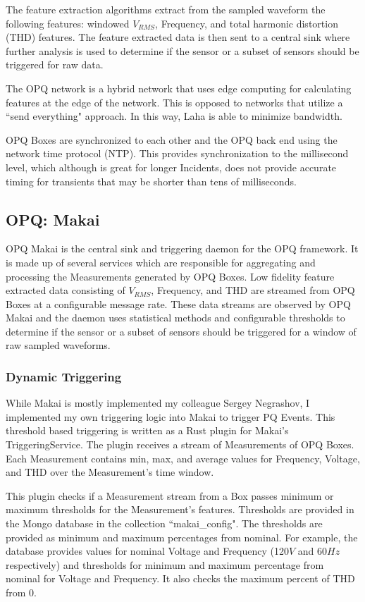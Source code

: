 The feature extraction algorithms extract from the sampled waveform the following features: windowed $V_{RMS}$, Frequency, and total harmonic distortion (THD) features. The feature extracted data is then sent to a central sink where further analysis is used to determine if the sensor or a subset of sensors should be triggered for raw data.

The OPQ network is a hybrid network that uses edge computing for calculating features at the edge of the network. This is opposed to networks that utilize a ``send everything" approach. In this way, Laha is able to minimize bandwidth.

OPQ Boxes are synchronized to each other and the OPQ back end using the network time protocol (NTP). This provides synchronization to the millisecond level, which although is great for longer Incidents, does not provide accurate timing for transients that may be shorter than tens of milliseconds.

\subsection{OPQ: Makai}\label{subsec:opq:-makai}
OPQ Makai is the central sink and triggering daemon for the OPQ framework. It is made up of several services which are responsible for aggregating and processing the Measurements generated by OPQ Boxes. Low fidelity feature extracted data consisting of $V_{RMS}$, Frequency, and THD are streamed from OPQ Boxes at a configurable message rate. These data streams are observed by OPQ Makai and the daemon uses statistical methods and configurable thresholds to determine if the sensor or a subset of sensors should be triggered for a window of raw sampled waveforms.

\subsubsection{Dynamic Triggering}\label{subsubsec:dynamic-triggering}

While Makai is mostly implemented my colleague Sergey Negrashov, I implemented my own triggering logic into Makai to trigger PQ Events. This threshold based triggering is written as a Rust plugin for Makai's TriggeringService. The plugin receives a stream of Measurements of OPQ Boxes. Each Measurement contains min, max, and average values for Frequency, Voltage, and THD over the Measurement's time window.

This plugin checks if a Measurement stream from a Box passes minimum or maximum thresholds for the Measurement's features. Thresholds are provided in the Mongo database in the collection ``makai\_config". The thresholds are provided as minimum and maximum percentages from nominal. For example, the database provides values for nominal Voltage and Frequency (120$V$ and 60$Hz$ respectively) and thresholds for minimum and maximum percentage from nominal for Voltage and Frequency. It also checks the maximum percent of THD from 0.

